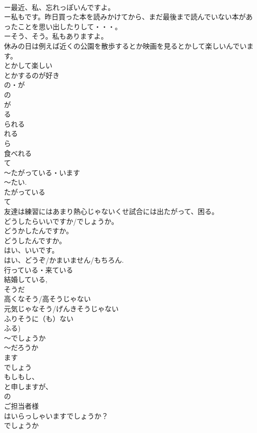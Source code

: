 \documentclass[8pt]{extreport}
\begin{document}
\begin{CJK}{UTF8}{min}
\\	ー最近、私、忘れっぽいんですよ。
\\	ー私もです。昨日買った本を読みかけてから、まだ最後まで読んでいない本があったことを思い出したりして・・・。
\\	ーそう、そう。私もありますよ。
\\	休みの日は例えば近くの公園を散歩するとか映画を見るとかして楽しいんでいます。
\\	とかして楽しい
\\	とかするのが好き	
\\	の・が
\\	の 
\\	が 
\\	る
\\	られる 
\\	れる
\\	ら
\\	食べれる	
\\	て
\\	～たがっている・います
\\	～たい.
\\	たがっている 
\\	て 
\\	友達は練習にはあまり熱心じゃないくせ試合には出たがって、困る。
\\	どうしたらいいですか/でしょうか。
\\	どうかしたんですか。
\\	どうしたんですか。
\\	はい、いいです。 
\\	はい、どうぞ/かまいません/もちろん.	
\\	行っている・来ている
\\	結婚している, 
\\	そうだ 
\\	高くなそう/高そうじゃない
\\	元気じゃなそう/げんきそうじゃない
\\	ふりそうに（も）ない　
\\	ふる)	
\\	～でしょうか 
\\	～だろうか 
\\	ます
\\	でしょう 
\\	もしもし、
\\	と申しますが、
\\	の
\\	ご担当者様
\\	はいらっしゃいますでしょうか？
\\	でしょうか 

\end{CJK}
\end{document}

